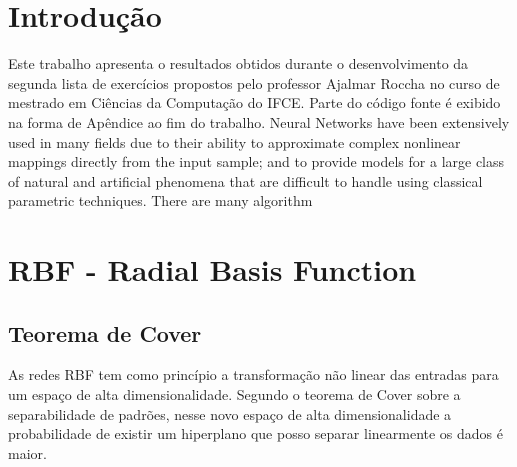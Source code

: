 \documentclass[
	article,			%
	11pt,				%
	oneside,			%
	a4paper,			%
	english,			%
	brazil,				%
	sumario=tradicional
	]{abntex2}
\begin{document}



%
%
\maketitle
\frenchspacing 



\textual

\section*{Introdução}
Este trabalho apresenta o resultados obtidos durante o desenvolvimento da
segunda lista de exercícios propostos pelo professor Ajalmar Roccha no curso de
mestrado em Ciências da Computação do IFCE. Parte do código fonte é exibido na
forma de Apêndice ao fim do trabalho.
   Neural Networks have been extensively used in many fields due to their ability
to approximate complex nonlinear mappings directly from the input sample; and
to provide models for a large class of natural and artificial phenomena that are
difficult to handle using classical parametric techniques. There are many algorithm

\section*{RBF - Radial Basis Function}

\subsection{Teorema de Cover} As redes RBF tem como princípio a transformação
não linear das entradas para um espaço de alta dimensionalidade. Segundo o
teorema de Cover sobre a separabilidade de padrões, nesse novo espaço de alta
dimensionalidade a probabilidade de existir um hiperplano que posso separar
linearmente os dados é maior.
\end{document}
